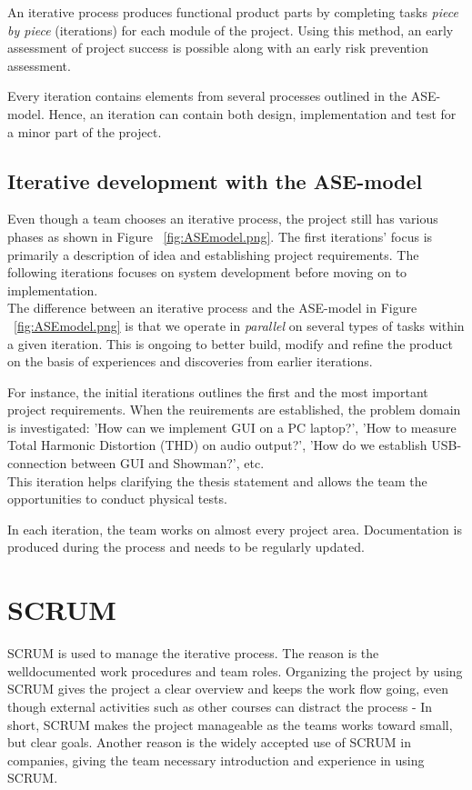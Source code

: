 An iterative process produces functional product parts by completing tasks \textit{piece by piece} (iterations) for each module of the project. Using this method, an early assessment of project success is possible along with an early risk prevention assessment. \newline

Every iteration contains elements from several processes outlined in the ASE-model. Hence, an iteration can contain both design, implementation and test for a minor part of the project. \\

\subsection{Iterative development with the ASE-model}
Even though a team chooses an iterative process, the project still has various phases as shown in Figure ~\ref{fig:ASEmodel.png}. The first iterations' focus is primarily a description of idea and establishing project requirements. The following iterations focuses on system development before moving on to implementation. \\
The difference between an iterative process and the ASE-model in Figure ~\ref{fig:ASEmodel.png} is that we operate in \textit{parallel} on several types of tasks within a given iteration. This is ongoing to better build, modify and refine the product on the basis of experiences and discoveries from earlier iterations. \newline

For instance, the initial iterations outlines the first and the most important project requirements. When the reuirements are established, the problem domain is investigated: 'How can we implement GUI on a PC laptop?', 'How to measure Total Harmonic Distortion (THD) on audio output?', 'How do we establish USB-connection between GUI and Showman?', etc. \\
This iteration helps clarifying the thesis statement and allows the team the opportunities to conduct physical tests. \newline

In each iteration, the team works on almost every project area. Documentation is produced during the process and needs to be regularly updated. \\ 

\section{SCRUM}
SCRUM is used to manage the iterative process. The reason is the welldocumented work procedures and team roles. Organizing the project by using SCRUM gives the project a clear overview and keeps the work flow going, even though external activities such as other courses can distract the process - In short, SCRUM makes the project manageable as the teams works toward small, but clear goals. Another reason is the widely accepted use of SCRUM in companies, giving the team necessary introduction and experience in using SCRUM. \newline

